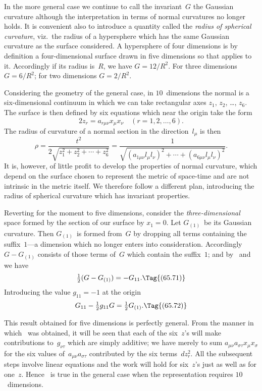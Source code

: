 \documentclass[12pt]{book}
\begin{document}
In the more general case we continue to call the invariant~$G$ the Gaussian
curvature although the interpretation in terms of normal curvatures no longer
%
holds. It is convenient also to introduce a quantity called the \emph{radius of
spherical curvature}, viz.\ the radius of a hypersphere which has the same
%
Gaussian curvature as the surface considered\footnotemark.\footnotetext
  {A hypersphere of four dimensions is by definition a four-dimensional surface drawn in five
  dimensions so that  applies to it. Accordingly if its radius is~$R$, we have $G = 12/R^{2}$. For
  three dimensions $G = 6/R^{2}$; for two dimensions $G = 2/R^{2}$.}

Considering the geometry of the general case, in $10$~dimensions the normal is
a six-dimensional continuum in which we can take rectangular axes $z_{1}$, $z_{2}$, \dots, $z_{6}$.
The surface is then defined by six equations which near the origin take the
form
\[
2z_{r} = a_{r\mu\nu} x_{\mu} x_{\nu}\quad (r = 1, 2, \dots, 6).
\]
The radius of curvature of a normal section in the direction~$l_{\mu}$ is then
\[
\rho = \frac{t^{2}}{2\sqrt{z_{1}^{2} + z_{2}^{2} + \cdots + z_{6}^{2}}}
 = \frac{1}{\sqrt{(a_{1\mu\nu} l_{\mu} l_{\nu})^{2} + \cdots + (a_{6\mu\nu} l_{\mu} l_{\nu})^{2}}}.
\]
It is, however, of little profit to develop the properties of normal curvature,
which depend on the surface chosen to represent the metric of space-time
and are not intrinsic in the metric itself. We therefore follow a different plan,
introducing the radius of spherical curvature which has invariant properties.

Reverting for the moment to five dimensions, consider the \emph{three-dimensional}
space formed by the section of our surface by $x_{1} = 0$. Let $G_{(1)}$~be its Gaussian
curvature. Then $G_{(1)}$~is formed from~$G$ by dropping all terms containing the
%
suffix~$1$---a dimension which no longer enters into consideration. Accordingly
$G - G_{(1)}$ consists of those terms of~$G$ which contain the suffix~$1$; and by~
and~ we have
\[
\tfrac{1}{2}(G - G_{(1)}) = -G_{11}.
\Tag{(65.71)}
\]
Introducing the value $g_{11} = -1$ at the origin
\[
G_{11} - \tfrac{1}{2}g_{11} G = \tfrac{1}{2}G_{(1)}.
\Tag{(65.72)}
\]

This result obtained for five dimensions is perfectly general. From the
manner in which ~was obtained, it will be seen that each of the six~$z$'s will
make contributions to~$g_{\nu\tau}$ which are simply additive; we have merely to sum
$a_{\mu\nu} a_{\sigma\tau} x_{\mu} x_{\sigma}$ for the six values of~$a_{\mu\nu} a_{\sigma\tau}$ contributed by the six terms~$dz_{r}^{2}$. All the
subsequent steps involve linear equations and the work will hold for six~$z$'s
just as well as for one~$z$. Hence ~is true in the general case when the
representation requires $10$~dimensions.
\end{document}
